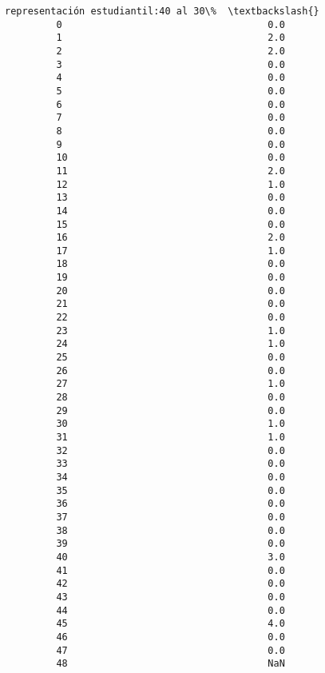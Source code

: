 \documentclass[11pt]{article}
\begin{document}
\begin{Verbatim}[commandchars=\\\{\}]
             representación estudiantil:40 al 30\%  \textbackslash{}
         0                                    0.0   
         1                                    2.0   
         2                                    2.0   
         3                                    0.0   
         4                                    0.0   
         5                                    0.0   
         6                                    0.0   
         7                                    0.0   
         8                                    0.0   
         9                                    0.0   
         10                                   0.0   
         11                                   2.0   
         12                                   1.0   
         13                                   0.0   
         14                                   0.0   
         15                                   0.0   
         16                                   2.0   
         17                                   1.0   
         18                                   0.0   
         19                                   0.0   
         20                                   0.0   
         21                                   0.0   
         22                                   0.0   
         23                                   1.0   
         24                                   1.0   
         25                                   0.0   
         26                                   0.0   
         27                                   1.0   
         28                                   0.0   
         29                                   0.0   
         30                                   1.0   
         31                                   1.0   
         32                                   0.0   
         33                                   0.0   
         34                                   0.0   
         35                                   0.0   
         36                                   0.0   
         37                                   0.0   
         38                                   0.0   
         39                                   0.0   
         40                                   3.0   
         41                                   0.0   
         42                                   0.0   
         43                                   0.0   
         44                                   0.0   
         45                                   4.0   
         46                                   0.0   
         47                                   0.0   
         48                                   NaN   
         

\end{Verbatim}
\end{document}

